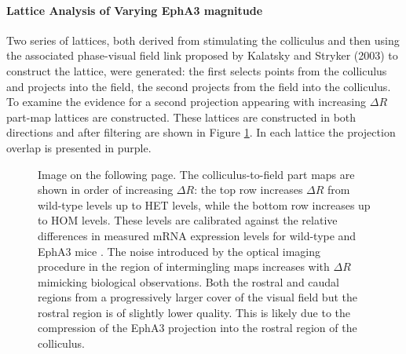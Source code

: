 \paragraph{Lattice Analysis of Varying EphA3 magnitude}
Two series of lattices, both derived from stimulating the colliculus and then using the associated phase-visual field link proposed by Kalatsky and Stryker (2003) to construct the lattice, were generated: the first selects points from the colliculus and projects into the field, the second projects from the field into the colliculus. To examine the evidence for a second projection appearing with increasing $\Delta R$ part-map lattices are constructed. These lattices are constructed in both directions and after filtering are shown in Figure \ref{fig:partmapsCTOF}. In each lattice the projection overlap is presented in purple. 
\begin{figure}
	\def\c{The colliculus-to-field part maps are shown in order of increasing $\Delta R$. }
	\caption[\c]{ Image on the following page. The colliculus-to-field part maps are shown in order of increasing $\Delta R$: the top row increases $\Delta R$ from wild-type levels up to HET levels, while the bottom row increases up to HOM levels. These levels are calibrated against the relative differences in measured mRNA expression levels for wild-type and EphA3 mice \cite{Reber2004-wq}. The noise introduced by the optical imaging procedure in the region of intermingling maps increases with $\Delta R$ mimicking biological observations. Both the rostral and caudal regions from a progressively larger cover of the visual field but the rostral region is of slightly lower quality. This is likely due to the compression of the EphA3 projection into the rostral region of the colliculus. \label{fig:partmapsCTOF}}
\end{figure}
